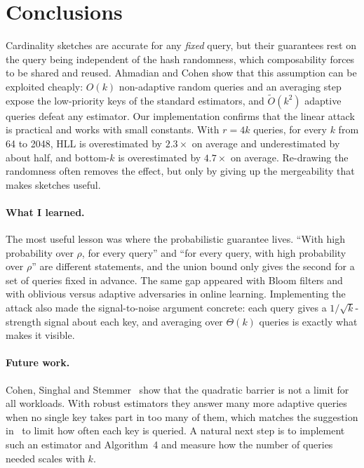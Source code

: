 \documentclass{cccg20}
\begin{document}
\section{Conclusions}

Cardinality sketches are accurate for any \emph{fixed} query, but their guarantees rest on the query being independent of the hash randomness, which composability forces to be shared and reused. Ahmadian and Cohen show that this assumption can be exploited cheaply: $O(k)$ non-adaptive random queries and an averaging step expose the low-priority keys of the standard estimators, and $\tilde O(k^2)$ adaptive queries defeat any estimator. Our implementation confirms that the linear attack is practical and works with small constants. With $r=4k$ queries, for every $k$ from 64 to 2048, HLL is overestimated by $2.3\times$ on average and underestimated by about half, and bottom-$k$ is overestimated by $4.7\times$ on average. Re-drawing the randomness often removes the effect, but only by giving up the mergeability that makes sketches useful.

\paragraph{What I learned.}
The most useful lesson was where the probabilistic guarantee lives. ``With high probability over $\rho$, for every query'' and ``for every query, with high probability over $\rho$'' are different statements, and the union bound only gives the second for a set of queries fixed in advance. The same gap appeared with Bloom filters and with oblivious versus adaptive adversaries in online learning. Implementing the attack also made the signal-to-noise argument concrete: each query gives a $1/\sqrt{k}$-strength signal about each key, and averaging over $\Theta(k)$ queries is exactly what makes it visible.

\paragraph{Future work.}
Cohen, Singhal and Stemmer~\cite{cohen2025} show that the quadratic barrier is not a limit for all workloads. With robust estimators they answer many more adaptive queries when no single key takes part in too many of them, which matches the suggestion in~\cite{ahmadian2024} to limit how often each key is queried. A natural next step is to implement such an estimator and Algorithm~4 and measure how the number of queries needed scales with $k$.

\clearpage
\small


\end{document}
